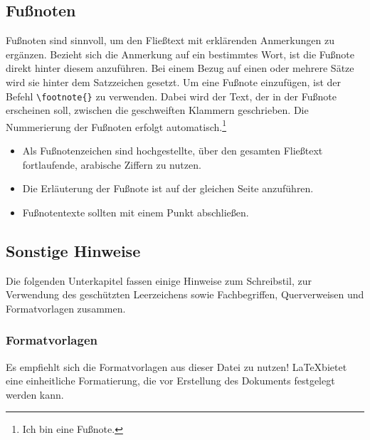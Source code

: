 \subsection{Fußnoten}

Fußnoten sind sinnvoll, um den Fließtext mit erklärenden Anmerkungen zu ergänzen. Bezieht sich die Anmerkung auf ein bestimmtes Wort, ist die Fußnote direkt hinter diesem anzuführen. Bei einem Bezug auf einen oder mehrere Sätze wird sie hinter dem Satzzeichen gesetzt. Um eine Fußnote einzufügen, ist der Befehl \verb!\footnote{}! zu verwenden. Dabei wird der Text, der in der Fußnote erscheinen soll, zwischen die geschweiften Klammern geschrieben. Die Nummerierung der Fußnoten erfolgt automatisch.\footnote{Ich bin eine Fußnote.}

\begin{itemize}
    \item Als Fußnotenzeichen sind hochgestellte, über den gesamten Fließtext fortlaufende, arabische Ziffern zu nutzen.
    \item Die Erläuterung der Fußnote ist auf der gleichen Seite anzuführen.
    \item Fußnotentexte sollten mit einem Punkt abschließen. 
\end{itemize}

\subsection{Sonstige Hinweise}
Die folgenden Unterkapitel fassen einige Hinweise zum Schreibstil, zur Verwendung des geschützten Leerzeichens sowie Fachbegriffen, Querverweisen und Formatvorlagen zusammen. 

\subsubsection{Formatvorlagen}
Es empfiehlt sich die Formatvorlagen aus dieser Datei zu nutzen! \LaTeX bietet eine einheitliche Formatierung, die vor Erstellung des Dokuments festgelegt werden kann. 

